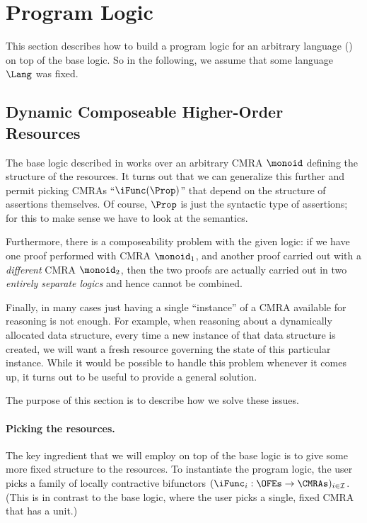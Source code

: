 
\section{Program Logic}
\label{sec:program-logic}

This section describes how to build a program logic for an arbitrary language (\cf {}) on top of the base logic.
So in the following, we assume that some language $\Lang$ was fixed.

\subsection{Dynamic Composeable Higher-Order Resources}
\label{sec:composeable-resources}

The base logic described in  works over an arbitrary CMRA $\monoid$ defining the structure of the resources.
It turns out that we can generalize this further and permit picking CMRAs ``$\iFunc(\Prop)$'' that depend on the structure of assertions themselves.
Of course, $\Prop$ is just the syntactic type of assertions; for this to make sense we have to look at the semantics.

Furthermore, there is a composeability problem with the given logic: if we have one proof performed with CMRA $\monoid_1$, and another proof carried out with a \emph{different} CMRA $\monoid_2$, then the two proofs are actually carried out in two \emph{entirely separate logics} and hence cannot be combined.

Finally, in many cases just having a single ``instance'' of a CMRA available for reasoning is not enough.
For example, when reasoning about a dynamically allocated data structure, every time a new instance of that data structure is created, we will want a fresh resource governing the state of this particular instance.
While it would be possible to handle this problem whenever it comes up, it turns out to be useful to provide a general solution.

The purpose of this section is to describe how we solve these issues.

\paragraph{Picking the resources.}
The key ingredient that we will employ on top of the base logic is to give some more fixed structure to the resources.
To instantiate the program logic, the user picks a family of locally contractive bifunctors $(\iFunc_i : \OFEs \to \CMRAs)_{i \in \mathcal{I}}$.
(This is in contrast to the base logic, where the user picks a single, fixed CMRA that has a unit.)

